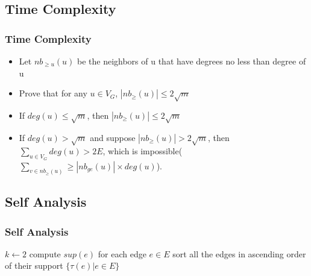 \documentclass{beamer}
\begin{document}

\subsection{Time Complexity}
\begin{frame}
\frametitle{Time Complexity}

\begin{itemize}
	\item Let $nb_{\ge u}(u)$ be the neighbors of u that have degrees no less than degree of u
	\item Prove that for any $u\in V_{G}$, $|nb_{\ge}(u)|\le 2\sqrt{m}$
	\item If $deg(u)\le \sqrt{m}$, then $|nb_{\ge}(u)|\le 2\sqrt{m}$
	\item If  $deg(u)> \sqrt{m}$ and suppose $|nb_{\ge}(u)|> 2\sqrt{m}$, then $\sum_{u\in V_{G}} deg(u) > 2E$, which is impossible($\sum_{v\in nb_{\ge}(u)} \ge |nb_{ge}(u)|\times deg(u)$).

\end{itemize}

\end{frame}



\subsection{Self Analysis}
\frametitle{Self Analysis}
\begin{frame}
	\begin{algorithm}[H]
		
		$k \leftarrow 2$\;
		compute $sup(e)$ for each edge $e \in E$\;
		sort all the edges in ascending order of their support\;
		\Return $\{\tau(e)|e\in E\}$\;
	\end{algorithm}
\end{frame}
\end{document}
